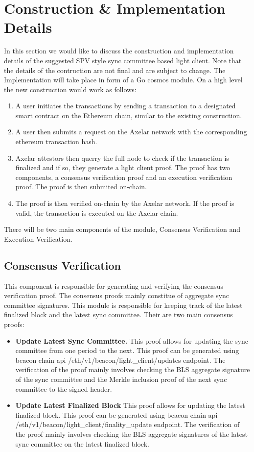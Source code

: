 \section{Construction \& Implementation Details}
In this section we would like to discuss the construction and implementation details 
of the suggested SPV style sync committee based light client. Note that the details of 
the contruction are not final and are subject to change. The Implementation will take 
place in form of a Go cosmos module. On a high level the new construction would work as
follows:
\begin{enumerate}
  \item A user initiates the transactions by sending a transaction to a designated smart
  contract on the Ethereum chain, similar to the existing construction.
  \item A user then submits a request on the Axelar network with the corresponding ethereum
  transaction hash.
  \item Axelar attestors then querry the full node to check if the transaction is finalized
  and if so, they generate a light client proof. The proof has two components, a consensus 
  verification proof and an execution verification proof. The proof is then submited on-chain.
  \item The proof is then verified on-chain by the Axelar network. If the proof is valid, the
  transaction is executed on the Axelar chain.
\end{enumerate}
There will be two main components of the module, Consensus Verification and Execution Verification.

\subsection{Consensus Verification}
This component is responsible for generating and verifying the consensus verification proof.
The consensus proofs mainly constitue of aggregate sync committee signatures. This module is 
responsible for keeping track of the latest finalized block and the latest sync committee.
Their are two main consensus proofs:
\begin{itemize}
  \item \textbf{Update Latest Sync Committee.} This proof allows for updating the sync committee
  from one period to the next. This proof can be generated using beacon chain api 
  /eth/v1/beacon/light\_client/updates
  endpoint. The verification of the proof mainly involves checking the BLS aggregate signature of the
  sync committee and the Merkle inclusion proof of the next sync committee to the signed header.
  \item \textbf{Update Latest Finalized Block} This proof allows for updating the latest finalized
  block. This proof can be generated using beacon chain api /eth/v1/beacon/light\_client/finality\_update
  endpoint. The verification of the proof mainly involves checking the BLS aggregate signatures of the
  latest sync committee on the latest finalized block.
\end{itemize}

